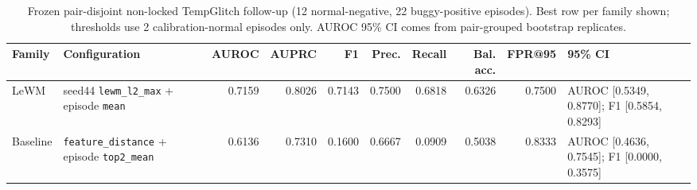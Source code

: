 \begin{table}[t]
\caption{Frozen pair-disjoint non-locked TempGlitch follow-up (12 normal-negative,
22 buggy-positive episodes). Best row per family shown; thresholds use 2
calibration-normal episodes only. AUROC 95\% CI comes from pair-grouped bootstrap
replicates.}
\label{tab:r5-bounded-results}
\centering
\scriptsize
\begin{tabularx}{\textwidth}{@{}lXrrrrrrrX@{}}
\toprule
Family & Configuration & AUROC & AUPRC & F1 & Prec. & Recall & Bal. acc. & FPR@95 & 95\% CI \\
\midrule
LeWM & seed44 \texttt{lewm\_l2\_max} + episode \texttt{mean} & 0.7159 & 0.8026 & 0.7143 & 0.7500 & 0.6818 & 0.6326 & 0.7500 & AUROC [0.5349, 0.8770]; F1 [0.5854, 0.8293] \\
Baseline & \texttt{feature\_distance} + episode \texttt{top2\_mean} & 0.6136 & 0.7310 & 0.1600 & 0.6667 & 0.0909 & 0.5038 & 0.8333 & AUROC [0.4636, 0.7545]; F1 [0.0000, 0.3575] \\
\bottomrule
\end{tabularx}
\end{table}
